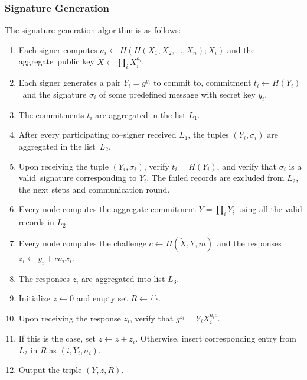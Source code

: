\subsubsection{Signature Generation}
The signature generation algorithm is as follows:
\begin{enumerate}
    \item Each signer computes ${a_i \leftarrow H(H(X_1,X_2,\dots,X_n);X_i)}$ and the aggregate\
    public key ${\tilde{X}\leftarrow\prod_i X_i^{a_i}}$.
    \item Each signer generates a pair $Y_i=g^{y_i}$ to commit to, commitment ${t_i\leftarrow H(Y_i)}$\
    and the signature $\sigma_i$ of some predefined message with secret key $y_i$.
    \item The commitments $t_i$ are aggregated in the list $L_1$.
    \item After every participating co--signer received $L_1$, the tuples ${(Y_i,\sigma_i)}$ are aggregated in the list\
    $L_2$.
    \item Upon receiving the tuple ${(Y_i,\sigma_i)}$, verify ${t_i = H(Y_i)}$, and verify that $\sigma_i$ is a valid\
    signature corresponding to $Y_i$.
    The failed records are excluded from $L_2$, the next steps and communication round.
    \item Every node computes the aggregate commitment ${Y=\prod_i Y_i}$ using all the valid records in $L_2$.
    \item Every node computes the challenge ${c\leftarrow H(\tilde{X}, Y, m)}$\
    and the responses ${z_i\leftarrow y_i + ca_ix_i}$.
    \item The responses $z_i$ are aggregated into list $L_3$.
    \item Initialize $z\leftarrow 0$ and empty set $R\leftarrow\{\}$.
    \item Upon receiving the response $z_i$, verify that ${g^{z_i} = Y_i X_i^{a_ic}}$.
    \item If this is the case, set ${z\leftarrow z+z_i}$.
    Otherwise, insert corresponding entry from $L_2$ in $R$ as ${(i, Y_i, \sigma_i)}$.
    \item Output the triple ${(Y,z,R)}$.
\end{enumerate}

